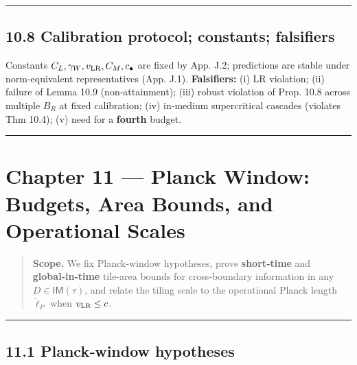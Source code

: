 \documentclass[
]{article}
\numberwithin{equation}{section}
\begin{document}
\begin{center}\rule{0.5\linewidth}{0.5pt}\end{center}

\hypertarget{calibration-protocol-constants-falsifiers}{%
\subsection{10.8 Calibration protocol; constants;
falsifiers}\label{calibration-protocol-constants-falsifiers}}

Constants \(C_L,\gamma_W,v_{\rm LR},C_M,c_\bullet\) are fixed by App.
J.2; predictions are stable under norm‑equivalent representatives (App.
J.1). \textbf{Falsifiers:} (i) LR violation; (ii) failure of Lemma 10.9
(non‑attainment); (iii) robust violation of Prop. 10.8 across multiple
\(B_R\) at fixed calibration; (iv) in‑medium supercritical cascades
(violates Thm 10.4); (v) need for a \textbf{fourth} budget.

\begin{center}\rule{0.5\linewidth}{0.5pt}\end{center}

\hypertarget{chapter-11-planck-window-budgets-area-bounds-and-operational-scales}{%
\section{Chapter 11 --- Planck Window: Budgets, Area Bounds, and
Operational
Scales}\label{chapter-11-planck-window-budgets-area-bounds-and-operational-scales}}

\begin{quote}
\textbf{Scope.} We fix Planck‑window hypotheses, prove
\textbf{short‑time} and \textbf{global‑in‑time} tile‑area bounds for
cross‑boundary information in any \(D\in\mathsf{IM}(\tau)\), and relate
the tiling scale to the operational Planck length \(\tilde\ell_P\) when
\(v_{\rm LR}\le c\).
\end{quote}

\begin{center}\rule{0.5\linewidth}{0.5pt}\end{center}

\hypertarget{planckwindow-hypotheses}{%
\subsection{11.1 Planck‑window
hypotheses}\label{planckwindow-hypotheses}}
\end{document}

